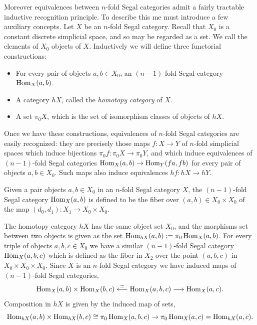\documentclass{amsart}
\begin{document}
Moreover equivalences between $n$-fold Segal categories admit a fairly tractable inductive recognition principle. To describe this me must introduce a few auxiliary concepts. Let $X$ be an $n$-fold Segal category. Recall that $X_0$ is a constant discrete simplicial space, and so may be regarded as a set. We call the elements of $X_0$ objects of $X$. 
Inductively we will define three functorial constructions:
\begin{itemize}
	\item For every pair of objects $a,b \in X_0$, an $(n-1)$-fold Segal category $\operatorname{Hom}_X(a,b)$.
	\item A category $\mathit{h}X$, called the {\em homotopy category} of $X$.
	\item A set $\pi_0 X$, which is the set of isomorphism classes of objects of $\mathit{h}X$. 
\end{itemize}
Once we have these constructions, equivalences of $n$-fold Segal categories are easily recognized: they are precisely those maps $f:X \to Y$ of $n$-fold simplicial spaces which induce bijections $\pi_0 f: \pi_0 X \to \pi_0 Y$, 
and which induce equivalences of $(n-1)$-fold Segal categories $\operatorname{Hom}_X(a,b) \to \operatorname{Hom}_Y(fa, fb)$ for every pair of objects $a,b \in X_0$. Such maps also induce equivalences $\mathit{h}f:\mathit{h}X \to \mathit{h}Y$.

Given a pair objects $a,b \in X_0$ in an $n$-fold Segal category $X$, the $(n-1)$-fold Segal category $\operatorname{Hom}_X(a,b)$ is defined to be the fiber over $(a,b) \in X_0 \times X_0$ of the map $(d_0, d_1): X_1 \to X_0 \times X_0$.  
\begin{center}
\end{center}
The homotopy category $\mathit{h}X$ has the same object set $X_0$, and the morphisms set between two objects is given as the set $\operatorname{Hom}_{\mathit{h}X}(a,b) := \pi_0 \operatorname{Hom}_X(a,b)$. For every triple of objects $a,b,c \in X_0$ we have a similar $(n-1)$-fold Segal category $\operatorname{Hom}_X(a,b,c)$ which is defined as the fiber in $X_2$ over the point $(a,b,c)$ in $X_0 \times X_0 \times X_0$. Since $X$ is an $n$-fold Segal category we have induced maps of $(n-1)$-fold Segal categories,
\begin{equation*}
	\operatorname{Hom}_X(a,b) \times \operatorname{Hom}_X(b,c) \stackrel{\simeq}{\longleftarrow} \operatorname{Hom}_X(a,b,c) \stackrel{}{\longrightarrow} \operatorname{Hom}_X(a,c).
\end{equation*}
Composition in $\mathit{h}X$ is given by the induced map of sets,
\begin{equation*}
	 \operatorname{Hom}_{\mathit{h}X}(a,b) \times \operatorname{Hom}_{\mathit{h}X}(b,c) \cong \pi_0 \operatorname{Hom}_X(a,b,c)\to \pi_0 \operatorname{Hom}_X(a,c) = \operatorname{Hom}_{\mathit{h}X}(a,c).
\end{equation*}
\end{document}
